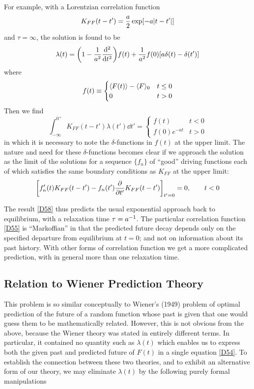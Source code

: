 For example, with a Lorentzian correlation function
\begin{equation}
	\label{D55}
	K_{FF}(t - t') = \frac{a}{2} \exp[-a \lvert t - t'\rvert]
\end{equation}
and $\tau = \infty$, the solution is found to be
\begin{equation}
	\lambda(t) = \left(1 - \frac{1}{a^2}\odv[ord={2}]{}{t}\right) f(t) + \frac{1}{a^2} f(0) [a \delta(t) - \delta(t')]
\end{equation}
where
\begin{equation}
	f(t) \equiv
		\begin{cases}
			\langle F(t)\rangle - \langle F\rangle_0 &t \leq 0\\
			0 & t > 0
		\end{cases}
\end{equation}
Then we find
\begin{equation}
	\label{D58}
	\int_{-\infty}^{0^+} K_{FF}(t - t') \lambda(t') \dd t' =
		\begin{cases}
			f(t) & t < 0\\
			f(0) e^{-at} & t > 0
		\end{cases}
\end{equation}
in which it is necessary to note the $\delta$-functions in $f(t)$ at the upper limit.
The nature and need for these $\delta$-functions becomes clear if we approach the solution as the limit of the solutions for a sequence $\{f_n\}$ of ``good'' driving functions each of which satisfies the same boundary conditions as $K_{FF}$ at the upper limit:
\begin{equation}
	\left[f'_n(t) K_{FF}(t - t') - f_n(t') \pdv*{K_{FF}(t - t')}{t'}\right]_{t'=0} = 0, \qquad t < 0
\end{equation}


The result \eqref{D58} thus predicts the usual exponential approach back to equilibrium, with a relaxation time $\tau = a^{-1}$.
The particular correlation function \eqref{D55} is ``Markoffian'' in that the predicted future decay depends only on the specified departure from equilibrium at $t = 0$; and not on information about its past history.
With other forms of correlation function we get a more complicated prediction, with in general more than one relaxation time.


\subsection{Relation to Wiener Prediction Theory}
This problem is so similar conceptually to Wiener's (1949) problem of optimal prediction of the future of a random function whose past is given that one would guess them to be mathematically related.
However, this is not obvious from the above, because the Wiener theory was stated in entirely different terms.
In particular, it contained no quantity such as $\lambda(t)$ which enables us to express both the given past and predicted future of $F(t)$ in a single equation \eqref{D54}.
To establish the connection between these two theories, and to exhibit an alternative form of our theory, we may eliminate $\lambda(t)$ by the following purely formal manipulations

